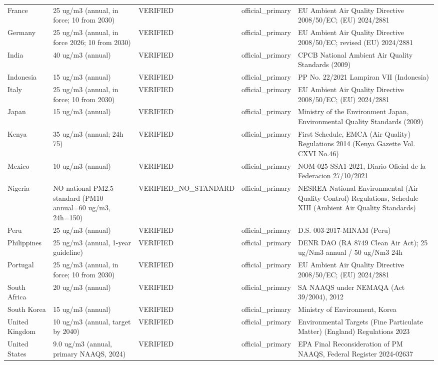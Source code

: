 \begin{longtable}{llp{3.0cm}lp{4.6cm}}
France & 25 ug/m3 (annual, in force; 10 from 2030) & VERIFIED & official\_primary & EU Ambient Air Quality Directive 2008/50/EC; (EU) 2024/2881 \\
Germany & 25 ug/m3 (annual, in force 2026; 10 from 2030) & VERIFIED & official\_primary & EU Ambient Air Quality Directive 2008/50/EC; revised (EU) 2024/2881 \\
India & 40 ug/m3 (annual) & VERIFIED & official\_primary & CPCB National Ambient Air Quality Standards (2009) \\
Indonesia & 15 ug/m3 (annual) & VERIFIED & official\_primary & PP No. 22/2021 Lampiran VII (Indonesia) \\
Italy & 25 ug/m3 (annual, in force; 10 from 2030) & VERIFIED & official\_primary & EU Ambient Air Quality Directive 2008/50/EC; (EU) 2024/2881 \\
Japan & 15 ug/m3 (annual) & VERIFIED & official\_primary & Ministry of the Environment Japan, Environmental Quality Standards (2009) \\
Kenya & 35 ug/m3 (annual; 24h 75) & VERIFIED & official\_primary & First Schedule, EMCA (Air Quality) Regulations 2014 (Kenya Gazette Vol. CXVI No.46) \\
Mexico & 10 ug/m3 (annual) & VERIFIED & official\_primary & NOM-025-SSA1-2021, Diario Oficial de la Federacion 27/10/2021 \\
Nigeria & NO national PM2.5 standard (PM10 annual=60 ug/m3, 24h=150) & VERIFIED\_NO\_STANDARD & official\_primary & NESREA National Environmental (Air Quality Control) Regulations, Schedule XIII (Ambient Air Quality Standards) \\
Peru & 25 ug/m3 (annual) & VERIFIED & official\_primary & D.S. 003-2017-MINAM (Peru) \\
Philippines & 25 ug/m3 (annual, 1-year guideline) & VERIFIED & official\_primary & DENR DAO (RA 8749 Clean Air Act); 25 ug/Nm3 annual / 50 ug/Nm3 24h \\
Portugal & 25 ug/m3 (annual, in force; 10 from 2030) & VERIFIED & official\_primary & EU Ambient Air Quality Directive 2008/50/EC; (EU) 2024/2881 \\
South Africa & 20 ug/m3 (annual) & VERIFIED & official\_primary & SA NAAQS under NEMAQA (Act 39/2004), 2012 \\
South Korea & 15 ug/m3 (annual) & VERIFIED & official\_primary & Ministry of Environment, Korea \\
United Kingdom & 10 ug/m3 (annual, target by 2040) & VERIFIED & official\_primary & Environmental Targets (Fine Particulate Matter) (England) Regulations 2023 \\
United States & 9.0 ug/m3 (annual, primary NAAQS, 2024) & VERIFIED & official\_primary & EPA Final Reconsideration of PM NAAQS, Federal Register 2024-02637 \\
\bottomrule
\end{longtable}
